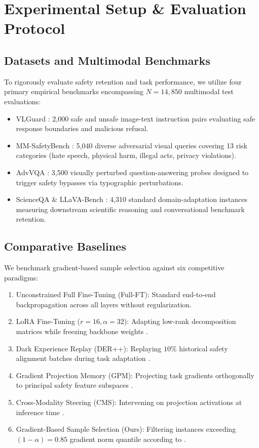 \documentclass[10pt,journal,compsoc,twocolumn]{IEEEtran}
\begin{document}
\begin{table}[t]
\section{Experimental Setup \& Evaluation Protocol}



\subsection{Datasets and Multimodal Benchmarks}

To rigorously evaluate safety retention and task performance, we utilize four primary empirical benchmarks encompassing $N = 14,850$ multimodal test evaluations:
\begin{itemize}
  \item VLGuard \cite{arxiv_2406_00584}: 2,000 safe and unsafe image-text instruction pairs evaluating safe response boundaries and malicious refusal.
  \item MM-SafetyBench \cite{crossref_10_48550_arxiv_2311_17600}: 5,040 diverse adversarial visual queries covering 13 risk categories (hate speech, physical harm, illegal acts, privacy violations).
  \item AdvVQA \cite{arxiv_2308_12898}: 3,500 visually perturbed question-answering probes designed to trigger safety bypasses via typographic perturbations.
  \item ScienceQA \& LLaVA-Bench \cite{arxiv_2604_17215}: 4,310 standard domain-adaptation instances measuring downstream scientific reasoning and conversational benchmark retention.
\end{itemize}


\subsection{Comparative Baselines}

We benchmark gradient-based sample selection against six competitive paradigms:
\begin{enumerate}
  \item Unconstrained Full Fine-Tuning (Full-FT): Standard end-to-end backpropagation across all layers without regularization.
  \item LoRA Fine-Tuning ($r=16, \alpha=32$): Adapting low-rank decomposition matrices while freezing backbone weights \cite{arxiv_2308_12898}.
  \item Dark Experience Replay (DER++): Replaying $10\%$ historical safety alignment batches during task adaptation \cite{arxiv_2406_04028}.
  \item Gradient Projection Memory (GPM): Projecting task gradients orthogonally to principal safety feature subspaces \cite{arxiv_2404_01131}.
  \item Cross-Modality Steering (CMS): Intervening on projection activations at inference time \cite{arxiv_2501_02497}.
  \item Gradient-Based Sample Selection (Ours): Filtering instances exceeding $(1-\alpha)=0.85$ gradient norm quantile according to \cite{arxiv_2604_17215}.
\end{enumerate}





\end{table}
\end{document}
